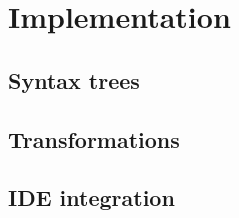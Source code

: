 \chapter{Implementation}

\section{Syntax trees}

\section{Transformations}

\section{IDE integration}